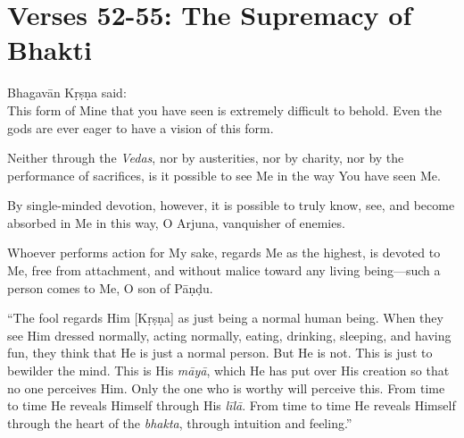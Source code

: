 \section{Verses 52-55: The Supremacy of Bhakti}\label{sec-verses-52-55-the-supremacy-of-bhakti}


{\hspace*{1em}Bhagavān Kṛṣṇa said: \\
This form of Mine that you have seen is extremely difficult to behold. Even the gods are ever eager to have a vision of this form.}

{Neither through the \textit{Vedas}, nor by austerities, nor by charity, nor by the performance of sacrifices, is it possible to see Me in the way You have seen Me.}

{By single-minded devotion, however, it is possible to truly know, see, and become absorbed in Me in this way, O Arjuna, vanquisher of enemies.}

{Whoever performs action for My sake, regards Me as the highest, is devoted to Me, free from attachment, and without malice toward any living being---such a person comes to Me, O son of Pāṇḍu.}

\enquote{The fool regards Him [Kṛṣṇa] as just being a normal human being. When they see Him dressed normally, acting normally, eating, drinking, sleeping, and having fun, they think that He is just a normal person. But He is not. This is just to bewilder the mind. This is His \textit{māyā}, which He has put over His creation so that no one perceives Him. Only the one who is worthy will perceive this. From time to time He reveals Himself through His \textit{līlā}. From time to time He reveals Himself through the heart of the \textit{bhakta}, through intuition and feeling.}

